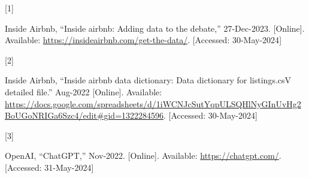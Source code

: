 \documentclass[
  journal,
]{IEEEtran}%
\newlength{\cslhangindent}
\newlength{\csllabelwidth}
\newlength{\cslentryspacingunit} %
\newenvironment{CSLReferences}[2] %
 {%
  \setlength{\parindent}{0pt}
  \ifodd #1
  \let\oldpar\par
  \def\par{\hangindent=\cslhangindent\oldpar}
  \fi
  \setlength{\parskip}{#2\cslentryspacingunit}
 }%
 {}
\newcommand{\CSLLeftMargin}[1]{\parbox[t]{\csllabelwidth}{#1}}
\newcommand{\CSLRightInline}[1]{\parbox[t]{\linewidth - \csllabelwidth}{#1}\break}
\providecommand{\bibfont}{\footnotesize}
\begin{document}
\hypertarget{refs}{}
\begin{CSLReferences}{0}{0}
\leavevmode{}%
\CSLLeftMargin{{[}1{]} }%
\CSLRightInline{Inside Airbnb, {``Inside airbnb: Adding data to the
debate,''} 27-Dec-2023. {[}Online{]}. Available:
\url{https://insideairbnb.com/get-the-data/}. {[}Accessed:
30-May-2024{]}}

\leavevmode{}%
\CSLLeftMargin{{[}2{]} }%
\CSLRightInline{Inside Airbnb, {``Inside airbnb data dictionary: Data
dictionary for listings.csV detailed file.''} Aug-2022 {[}Online{]}.
Available:
\url{https://docs.google.com/spreadsheets/d/1iWCNJcSutYqpULSQHlNyGInUvHg2BoUGoNRIGa6Szc4/edit\#gid=1322284596}.
{[}Accessed: 30-May-2024{]}}

\leavevmode{}%
\CSLLeftMargin{{[}3{]} }%
\CSLRightInline{OpenAI, {``ChatGPT,''} Nov-2022. {[}Online{]}.
Available: \url{https://chatgpt.com/}. {[}Accessed: 31-May-2024{]}}

\end{CSLReferences}


\ifCLASSOPTIONcaptionsoff
  \newpage
\fi



\pagebreak[3]
\end{document}
